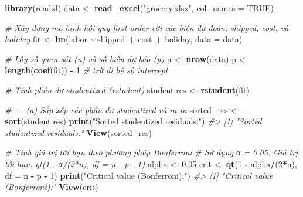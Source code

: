 \documentclass[
]{article}
\newenvironment{Shaded}{\begin{snugshade}}{\end{snugshade}}
\newcommand{\AttributeTok}[1]{\textcolor[rgb]{0.13,0.29,0.53}{#1}}
\newcommand{\CommentTok}[1]{\textcolor[rgb]{0.56,0.35,0.01}{\textit{#1}}}
\newcommand{\ConstantTok}[1]{\textcolor[rgb]{0.56,0.35,0.01}{#1}}
\newcommand{\DecValTok}[1]{\textcolor[rgb]{0.00,0.00,0.81}{#1}}
\newcommand{\FloatTok}[1]{\textcolor[rgb]{0.00,0.00,0.81}{#1}}
\newcommand{\FunctionTok}[1]{\textcolor[rgb]{0.13,0.29,0.53}{\textbf{#1}}}
\newcommand{\NormalTok}[1]{#1}
\newcommand{\OtherTok}[1]{\textcolor[rgb]{0.56,0.35,0.01}{#1}}
\newcommand{\SpecialCharTok}[1]{\textcolor[rgb]{0.81,0.36,0.00}{\textbf{#1}}}
\newcommand{\StringTok}[1]{\textcolor[rgb]{0.31,0.60,0.02}{#1}}
\begin{document}
\begin{Shaded}
\begin{Highlighting}[]
\FunctionTok{library}\NormalTok{(readxl)}
\NormalTok{data }\OtherTok{\textless{}{-}} \FunctionTok{read\_excel}\NormalTok{(}\StringTok{"grocery.xlsx"}\NormalTok{, }\AttributeTok{col\_names =} \ConstantTok{TRUE}\NormalTok{)}

\CommentTok{\# Xây dựng mô hình hồi quy first order với các biến dự đoán: shipped, cost, và holiday}
\NormalTok{fit }\OtherTok{\textless{}{-}} \FunctionTok{lm}\NormalTok{(labor }\SpecialCharTok{\textasciitilde{}}\NormalTok{ shipped }\SpecialCharTok{+}\NormalTok{ cost }\SpecialCharTok{+}\NormalTok{ holiday, }\AttributeTok{data =}\NormalTok{ data)}

\CommentTok{\# Lấy số quan sát (n) và số biến dự báo (p)}
\NormalTok{n }\OtherTok{\textless{}{-}} \FunctionTok{nrow}\NormalTok{(data)}
\NormalTok{p }\OtherTok{\textless{}{-}} \FunctionTok{length}\NormalTok{(}\FunctionTok{coef}\NormalTok{(fit)) }\SpecialCharTok{{-}} \DecValTok{1}  \CommentTok{\# trừ đi hệ số intercept}

\CommentTok{\# Tính phần dư studentized (rstudent)}
\NormalTok{student.res }\OtherTok{\textless{}{-}} \FunctionTok{rstudent}\NormalTok{(fit)}

\CommentTok{\# {-}{-}{-} (a) Sắp xếp các phần dư studentized và in ra}
\NormalTok{sorted\_res }\OtherTok{\textless{}{-}} \FunctionTok{sort}\NormalTok{(student.res)}
\FunctionTok{print}\NormalTok{(}\StringTok{"Sorted studentized residuals:"}\NormalTok{)}
\CommentTok{\#\textgreater{} [1] "Sorted studentized residuals:"}
\FunctionTok{View}\NormalTok{(sorted\_res)}

\CommentTok{\# Tính giá trị tới hạn theo phương pháp Bonferroni}
\CommentTok{\# Sử dụng α = 0.05. Giá trị tới hạn: qt(1 {-} α/(2*n), df = n {-} p {-} 1)}
\NormalTok{alpha }\OtherTok{\textless{}{-}} \FloatTok{0.05}
\NormalTok{crit }\OtherTok{\textless{}{-}} \FunctionTok{qt}\NormalTok{(}\DecValTok{1} \SpecialCharTok{{-}}\NormalTok{ alpha}\SpecialCharTok{/}\NormalTok{(}\DecValTok{2}\SpecialCharTok{*}\NormalTok{n), }\AttributeTok{df =}\NormalTok{ n }\SpecialCharTok{{-}}\NormalTok{ p }\SpecialCharTok{{-}} \DecValTok{1}\NormalTok{)}
\FunctionTok{print}\NormalTok{(}\StringTok{"Critical value (Bonferroni):"}\NormalTok{)}
\CommentTok{\#\textgreater{} [1] "Critical value (Bonferroni):"}
\FunctionTok{View}\NormalTok{(crit)}
\end{Highlighting}
\end{Shaded}
\end{document}

